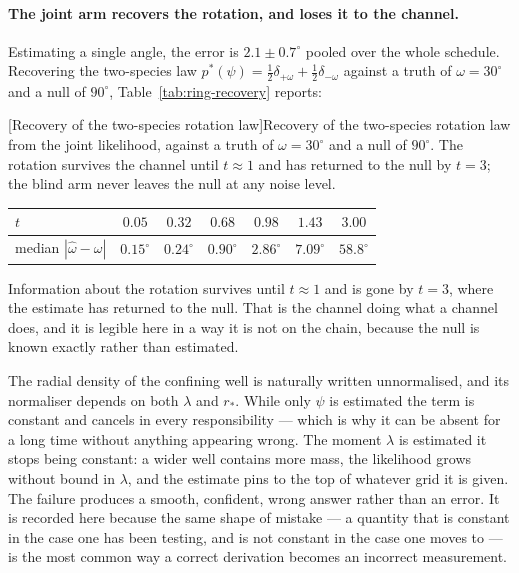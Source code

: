 \paragraph{The joint arm recovers the rotation, and loses it to the channel.}
Estimating a single angle, the error is $2.1\pm0.7^\circ$ pooled over the whole
schedule. Recovering the two-species law
$p^*(\psi)=\tfrac12\delta_{+\omega}+\tfrac12\delta_{-\omega}$ against a truth
of $\omega = 30^\circ$ and a null of $90^\circ$, Table~\ref{tab:ring-recovery}
reports:

\begin{center}
\begin{minipage}{\linewidth}\small\centering
{}[Recovery of the two-species rotation law]{Recovery of the two-species rotation law from the joint likelihood, against a truth of $\omega = 30^\circ$ and a null of $90^\circ$. The rotation survives the channel until $t \approx 1$ and has returned to the null by $t = 3$; the blind arm never leaves the null at any noise level.}
\label{tab:ring-recovery}
\begin{tabular}{@{}lcccccc@{}}
\toprule
$t$ & $0.05$ & $0.32$ & $0.68$ & $0.98$ & $1.43$ & $3.00$ \\
\midrule
median $|\hat\omega - \omega|$ & $0.15^\circ$ & $0.24^\circ$ & $0.90^\circ$
& $2.86^\circ$ & $7.09^\circ$ & $58.8^\circ$ \\
\bottomrule
\end{tabular}
\end{minipage}
\end{center}

Information about the rotation survives until $t\approx1$ and is gone by
$t=3$, where the estimate has returned to the null. That is the channel doing
what a channel does, and it is legible here in a way it is not on the chain,
because the null is known exactly rather than estimated.

\begin{remark}
The radial density of the confining well is naturally written unnormalised,
and its normaliser depends on both $\lambda$ and $r_*$. While only $\psi$ is
estimated the term is constant and cancels in every responsibility --- which
is why it can be absent for a long time without anything appearing wrong. The
moment $\lambda$ is estimated it stops being constant: a wider well contains
more mass, the likelihood grows without bound in $\lambda$, and the estimate
pins to the top of whatever grid it is given. The failure produces a smooth,
confident, wrong answer rather than an error. It is recorded here because the
same shape of mistake --- a quantity that is constant in the case one has been
testing, and is not constant in the case one moves to --- is the most common
way a correct derivation becomes an incorrect measurement.
\end{remark}

